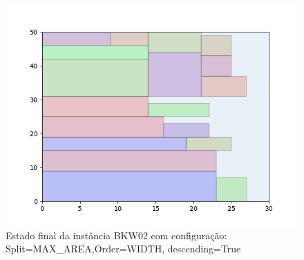 \begin{figure}[H]
    \centering
    \caption[]{Estado final da instância BKW02 com configuração: Split=MAX_AREA,Order=WIDTH, descending=True}
    \label{fig:bkw02-max_area-width-true}
    \includegraphics[scale=0.5]{output/figures/bkw/bkw02/max_area/width/true/00}
\end{figure}